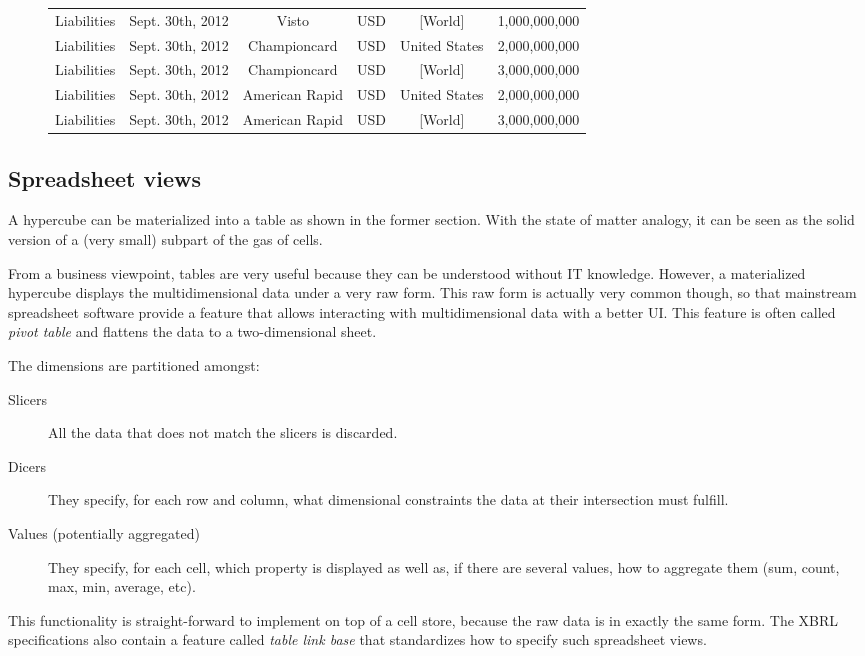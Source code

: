 \documentclass{acm_proc_article-sp}
\begin{document}
\begin{figure*}
\begin{tabular}{|c|c|c|c|c||c|}
Liabilities & Sept. 30th, 2012 & Visto & USD & [World] & 1,000,000,000 \\
Liabilities & Sept. 30th, 2012 & Championcard & USD & United States & 2,000,000,000 \\
Liabilities & Sept. 30th, 2012 & Championcard & USD & [World] & 3,000,000,000 \\
Liabilities & Sept. 30th, 2012 & American Rapid & USD & United States & 2,000,000,000 \\
Liabilities & Sept. 30th, 2012 & American Rapid & USD & [World] & 3,000,000,000 \\
\hline
\end{tabular}
\end{figure*}

\subsection{Spreadsheet views}

A hypercube can be materialized into a table as shown in the former section. With the state of matter analogy, it can be seen as the solid version of a (very small) subpart of the gas of cells.

From a business viewpoint, tables are very useful because they can be understood without IT knowledge. However, a materialized hypercube displays the multidimensional data under a very raw form. This raw form is actually very common though, so that mainstream spreadsheet software provide a feature that allows interacting with multidimensional data with a better UI. This feature is often called \emph{pivot table} and flattens the data to a two-dimensional sheet.

The dimensions are partitioned amongst:
\begin{description}
\item [Slicers] All the data that does not match the slicers is discarded.
\item [Dicers] They specify, for each row and column, what dimensional constraints the data at their intersection must fulfill.
\item [Values (potentially aggregated)] They specify, for each cell, which property is displayed as well as, if there are several values, how to aggregate them (sum, count, max, min, average, etc).
\end{description}

This functionality is straight-forward to implement on top of a cell store, because the raw data is in exactly the same form. The XBRL specifications also contain a feature called \emph{table link base} that standardizes how to specify such spreadsheet views.
\end{document}
